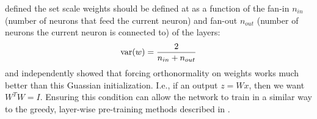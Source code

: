       \citet{glorot_understanding_2010} defined the set scale weights should be
      defined at as a function of the fan-in $n_{in}$ (number of neurons that feed
	  the current neuron) and fan-out $n_{out}$ (number of neurons the current neuron
	  is connected to) of the layers:
      \begin{equation}
        \mathrm{var}(w) = \frac{2}{n_{in} + n_{out}}
      \end{equation}
      \citet{saxe_exact_2013} and \citet{mishkin_all_2015} independently showed 
      that forcing orthonormality on weights works much better than this
      Guassian initialization. I.e., if an output $z=Wx$, then we want
      $W^TW=I$. Ensuring this condition can allow the network to train in
      a similar way to the greedy, layer-wise pre-training methods described in
      \citep{bengio_greedy_2007}.
% 
% 

